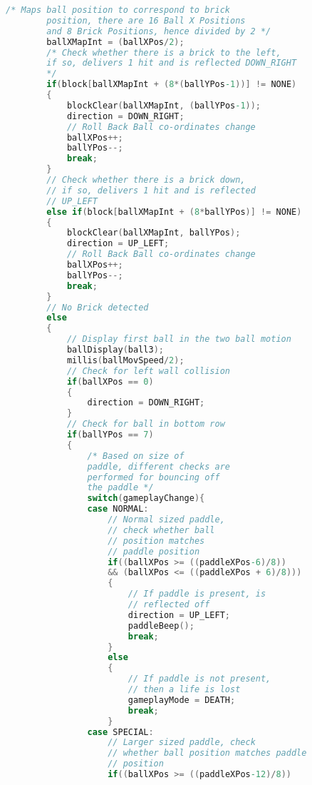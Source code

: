 \documentclass{article}
\begin{document}
\begin{lstlisting}[basicstyle = \small, language = C]
        /* Maps ball position to correspond to brick 
        position, there are 16 Ball X Positions
        and 8 Brick Positions, hence divided by 2 */
        ballXMapInt = (ballXPos/2);
        /* Check whether there is a brick to the left, 
        if so, delivers 1 hit and is reflected DOWN_RIGHT
        */
        if(block[ballXMapInt + (8*(ballYPos-1))] != NONE)
        {
            blockClear(ballXMapInt, (ballYPos-1));
            direction = DOWN_RIGHT;
            // Roll Back Ball co-ordinates change
            ballXPos++;
            ballYPos--;
            break;
        }
        // Check whether there is a brick down, 
        // if so, delivers 1 hit and is reflected 
        // UP_LEFT
        else if(block[ballXMapInt + (8*ballYPos)] != NONE)
        {
            blockClear(ballXMapInt, ballYPos);
            direction = UP_LEFT;
            // Roll Back Ball co-ordinates change
            ballXPos++;
            ballYPos--;
            break;
        }
        // No Brick detected
        else
        {
            // Display first ball in the two ball motion
            ballDisplay(ball3);
            millis(ballMovSpeed/2);
            // Check for left wall collision
            if(ballXPos == 0)
            {
                direction = DOWN_RIGHT;
            }
            // Check for ball in bottom row
            if(ballYPos == 7)
            {
                /* Based on size of
                paddle, different checks are 
                performed for bouncing off 
                the paddle */
                switch(gameplayChange){
                case NORMAL:
                    // Normal sized paddle, 
                    // check whether ball
                    // position matches 
                    // paddle position
                    if((ballXPos >= ((paddleXPos-6)/8)) 
                    && (ballXPos <= ((paddleXPos + 6)/8)))
                    {
                        // If paddle is present, is 
                        // reflected off
                        direction = UP_LEFT;
                        paddleBeep();
                        break;
                    }
                    else
                    {
                        // If paddle is not present, 
                        // then a life is lost
                        gameplayMode = DEATH;
                        break;
                    }
                case SPECIAL:
                    // Larger sized paddle, check 
                    // whether ball position matches paddle 
                    // position
                    if((ballXPos >= ((paddleXPos-12)/8)) 

\end{lstlisting}
\end{document}
